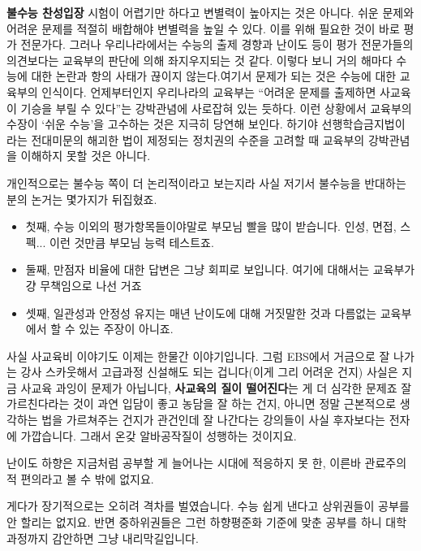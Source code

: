 \textbf{불수능 찬성입장}
시험이 어렵기만 하다고 변별력이 높아지는 것은 아니다. 쉬운 문제와 어려운 문제를 적절히 배합해야 변별력을 높일 수 있다. 이를 위해 필요한 것이 바로 평가 전문가다. 그러나 우리나라에서는 수능의 출제 경향과 난이도 등이 평가 전문가들의 의견보다는 교육부의 판단에 의해 좌지우지되는 것 같다. 이렇다 보니 거의 해마다 수능에 대한 논란과 항의 사태가 끊이지 않는다.여기서 문제가 되는 것은 수능에 대한 교육부의 인식이다. 언제부터인지 우리나라의 교육부는 “어려운 문제를 출제하면 사교육이 기승을 부릴 수 있다”는 강박관념에 사로잡혀 있는 듯하다. 이런 상황에서 교육부의 수장이 ‘쉬운 수능’을 고수하는 것은 지극히 당연해 보인다. 하기야 선행학습금지법이라는 전대미문의 해괴한 법이 제정되는 정치권의 수준을 고려할 때 교육부의 강박관념을 이해하지 못할 것은 아니다.
\vspace{5mm}

개인적으로는 불수능 쪽이 더 논리적이라고 보는지라 사실 저기서 불수능을 반대하는 분의 논거는 몇가지가 뒤집혔죠.
\vspace{5mm}
\begin{itemize}
    \item 첫째, 수능 이외의 평가항목들이야말로 부모님 빨을 많이 받습니다. 인성, 면접, 스펙... 이런 것만큼 부모님 능력 테스트죠.
    \item 둘째, 만점자 비율에 대한 답변은 그냥 회피로 보입니다. 여기에 대해서는 교육부가 걍 무책임으로 나선 거죠
    \item 셋째, 일관성과 안정성 유지는 매년 난이도에 대해 거짓말한 것과 다름없는 교육부에서 할 수 있는 주장이 아니죠.
\end{itemize}
\vspace{5mm}

사실 사교육비 이야기도 이제는 한물간 이야기입니다.
그럼 EBS에서 거금으로 잘 나가는 강사 스카웃해서 고급과정 신설해도 되는 겁니다(이게 그리 어려운 건지)
사실은 지금 사교육 과잉이 문제가 아닙니다, \textbf{사교육의 질이 떨어진다}는 게 더 심각한 문제죠
잘 가르친다라는 것이 과연 입담이 좋고 농담을 잘 하는 건지, 아니면 정말 근본적으로 생각하는 법을 가르쳐주는 건지가 관건인데
잘 나간다는 강의들이 사실 후자보다는 전자에 가깝습니다. 그래서 온갖 알바공작질이 성행하는 것이지요.
\vspace{5mm}

난이도 하향은 지금처럼 공부할 게 늘어나는 시대에 적응하지 못 한, 이른바 관료주의적 편의라고 볼 수 밖에 없지요.
\vspace{5mm}

게다가 장기적으로는 오히려 격차를 벌였습니다.
수능 쉽게 낸다고 상위권들이 공부를 안 할리는 없지요.
반면 중하위권들은 그런 하향평준화 기준에 맞춘 공부를 하니 대학 과정까지 감안하면 그냥 내리막길입니다.
\vspace{5mm}

